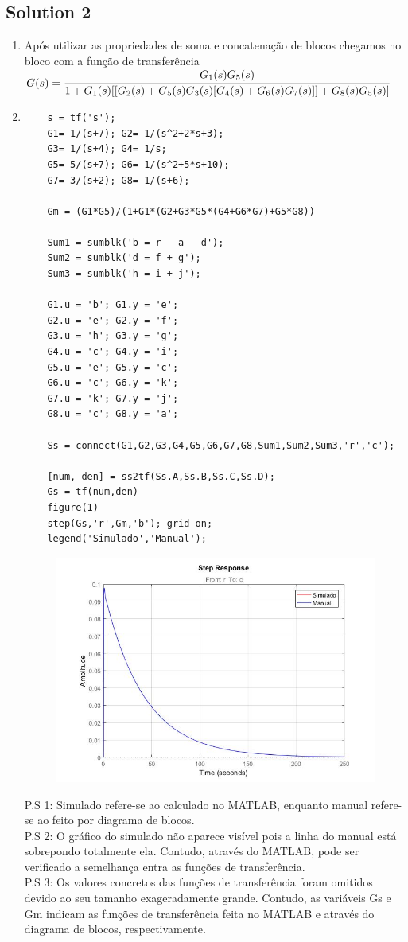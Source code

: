 \documentclass[a4paper,11pt]{article}
\begin{document}
\subsection*{Solution 2}
\begin{enumerate}
	\item Após utilizar as propriedades de soma e concatenação de blocos chegamos no bloco com a função de transferência \\$G(s) = \cfrac{G_1(s)G_5(s)}{1+G_1(s)[[G_2(s)+G_5(s)G_3(s)[G_4(s)+G_6(s)G_7(s)]]+G_8(s)G_5(s)]}$
	\item 
	\begin{lstlisting}
	s = tf('s');
	G1= 1/(s+7); G2= 1/(s^2+2*s+3);
	G3= 1/(s+4); G4= 1/s;
	G5= 5/(s+7); G6= 1/(s^2+5*s+10);
	G7= 3/(s+2); G8= 1/(s+6);
	
	Gm = (G1*G5)/(1+G1*(G2+G3*G5*(G4+G6*G7)+G5*G8))
	
	Sum1 = sumblk('b = r - a - d');
	Sum2 = sumblk('d = f + g');
	Sum3 = sumblk('h = i + j');
	
	G1.u = 'b'; G1.y = 'e';
	G2.u = 'e'; G2.y = 'f';
	G3.u = 'h'; G3.y = 'g';
	G4.u = 'c'; G4.y = 'i';
	G5.u = 'e'; G5.y = 'c';
	G6.u = 'c'; G6.y = 'k';
	G7.u = 'k'; G7.y = 'j';
	G8.u = 'c'; G8.y = 'a';
	
	Ss = connect(G1,G2,G3,G4,G5,G6,G7,G8,Sum1,Sum2,Sum3,'r','c');
	
	[num, den] = ss2tf(Ss.A,Ss.B,Ss.C,Ss.D);
	Gs = tf(num,den)
	figure(1)
	step(Gs,'r',Gm,'b'); grid on;
	legend('Simulado','Manual');
	\end{lstlisting}
	\begin{figure}[!h]  \includegraphics [scale=0.5] {Figures/exercise2} \end{figure}
	P.S 1: Simulado refere-se ao calculado no MATLAB, enquanto manual refere-se ao feito por diagrama de blocos.\\
	P.S 2: O gráfico do simulado não aparece visível pois a linha do manual está sobrepondo totalmente ela. Contudo, através do MATLAB, pode ser verificado a semelhança entra as funções de transferência.\\
	P.S 3: Os valores concretos das funções de transferência foram omitidos devido ao seu tamanho exageradamente grande. Contudo, as variáveis Gs e Gm indicam as funções de transferência feita no MATLAB e através do diagrama de blocos, respectivamente.
\end{enumerate}
\vskip0.4cm
\end{document}
